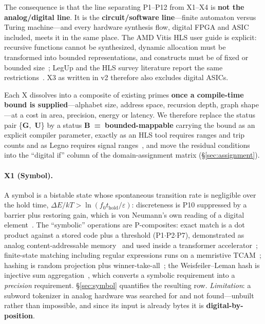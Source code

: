 \documentclass[11pt]{article}
\begin{document}
The consequence is that the line separating P1--P12 from X1--X4 is \textbf{not the analog/digital line}. It is the \textbf{circuit/software line}---finite automaton versus Turing machine---and every hardware synthesis flow, digital FPGA and ASIC included, meets it in the same place. The AMD Vitis HLS user guide is explicit: recursive functions cannot be synthesized, dynamic allocation must be transformed into bounded representations, and constructs must be of fixed or bounded size~\cite{ug1399}; LegUp and the HLS survey literature report the same restrictions~\cite{nane2016}. X3 as written in v2 therefore also excludes digital ASICs.

Each X dissolves into a composite of existing primes \textbf{once a compile-time bound is supplied}---alphabet size, address space, recursion depth, graph shape---at a cost in area, precision, energy or latency. We therefore replace the status pair \{\textbf{G},~\textbf{U}\} by a status \textbf{B~=~bounded-mappable} carrying the bound as an explicit compiler parameter, exactly as an HLS tool requires ranges and trip counts and as Legno requires signal ranges~\cite{legno2020}, and move the residual conditions into the ``digital if'' column of the domain-assignment matrix (\S\ref{sec:assignment}).

\paragraph{X1 (Symbol).} A symbol is a bistable state whose spontaneous transition rate is negligible over the hold time, $\Delta E/kT > \ln(f_0 t_{\mathrm{hold}}/\varepsilon)$: discreteness is P10 suppressed by a barrier plus restoring gain, which is von Neumann's own reading of a digital element~\cite{vonneumann1956}. The ``symbolic'' operations are P-composites: exact match is a dot product against a stored code plus a threshold (P1$\cdot$P2$\cdot$P7), demonstrated as analog content-addressable memory~\cite{li2020acam} and used inside a transformer accelerator~\cite{raceit2023}; finite-state matching including regular expressions runs on a memristive TCAM~\cite{graves2020tcam}; hashing is random projection plus winner-take-all~\cite{dasgupta2017,dasgupta2018}; the Weisfeiler--Leman hash is injective sum aggregation~\cite{xu2019gin}, which converts a symbolic requirement into a \textit{precision} requirement. \S\ref{sec:symbol} quantifies the resulting row. \textit{Limitation}: a subword tokenizer in analog hardware was searched for and not found---unbuilt rather than impossible, and since its input is already bytes it is \textbf{digital-by-position}.
\end{document}
